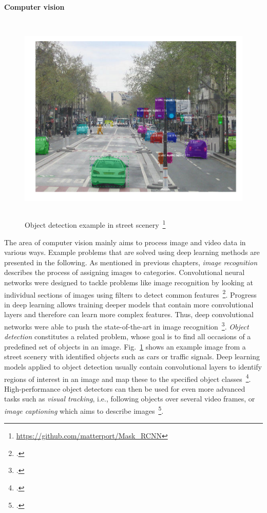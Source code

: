 \paragraph{Computer vision}
\label{sub:dl_app_cv}

\begin{figure}[h]
  \includegraphics[height=10cm]{img/mask_rcnn}
  \caption[Object detection example]{Object detection example in street scenery~\footnote{\url{https://github.com/matterport/Mask_RCNN}}}
\label{fig:obj_detection}
\end{figure}

The area of computer vision mainly aims to process image and video data in
various ways.
Example problems that are solved using deep learning methods are presented in
the following.
As mentioned in previous chapters, \textit{image recognition} describes the
process of assigning images to categories.
Convolutional neural networks were designed to tackle problems like image
recognition by looking at individual sections of images using filters to
detect common features~\footcite{LeCun1998}.
Progress in deep learning allows training deeper models that contain more
convolutional layers and therefore can learn more complex features.
Thus, deep convolutional networks were able to push the state-of-the-art in image recognition~\footcite{Krizhevsky2012, He2016}.
\textit{Object detection} constitutes a related problem, whose goal is
to find all occasions of a predefined set of objects in an image.
Fig.~\ref{fig:obj_detection} shows an example image from a street scenery
with identified objects such as cars or traffic signals.
Deep learning models applied to object detection usually contain convolutional
layers to identify regions of interest in an image and map these to the
specified object classes~\footcite{Girshick2012, He2017}.
High-performance object detectors can then be used for even more advanced
tasks such as \textit{visual tracking}, i.e., following objects over several video
frames, or \textit{image captioning} which aims to describe images~\footcite{Bertinetto2016, Karpathy2017}.

